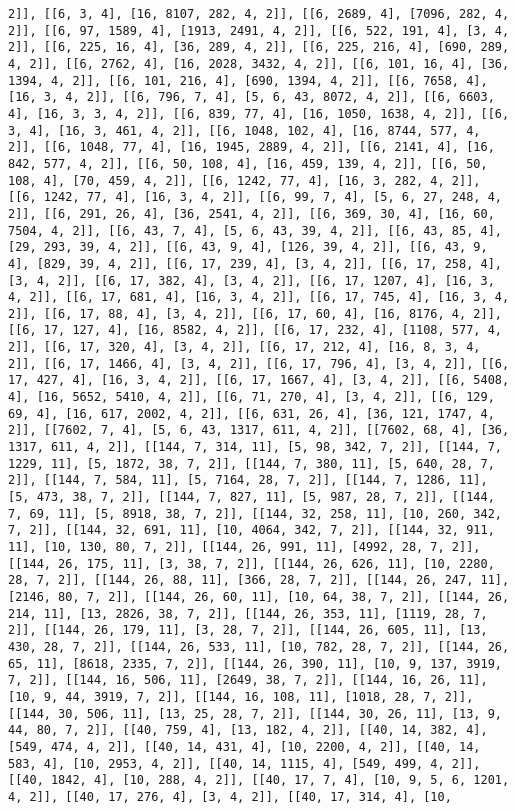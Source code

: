 \documentclass[12pt,fleqn]{article}\usepackage{../../common}
\begin{document}
\begin{verbatim}
2]], [[6, 3, 4], [16, 8107, 282, 4, 2]], [[6, 2689, 4], [7096, 282, 4, 2]], [[6, 97, 1589, 4], [1913, 2491, 4, 2]], [[6, 522, 191, 4], [3, 4, 2]], [[6, 225, 16, 4], [36, 289, 4, 2]], [[6, 225, 216, 4], [690, 289, 4, 2]], [[6, 2762, 4], [16, 2028, 3432, 4, 2]], [[6, 101, 16, 4], [36, 1394, 4, 2]], [[6, 101, 216, 4], [690, 1394, 4, 2]], [[6, 7658, 4], [16, 3, 4, 2]], [[6, 796, 7, 4], [5, 6, 43, 8072, 4, 2]], [[6, 6603, 4], [16, 3, 3, 4, 2]], [[6, 839, 77, 4], [16, 1050, 1638, 4, 2]], [[6, 3, 4], [16, 3, 461, 4, 2]], [[6, 1048, 102, 4], [16, 8744, 577, 4, 2]], [[6, 1048, 77, 4], [16, 1945, 2889, 4, 2]], [[6, 2141, 4], [16, 842, 577, 4, 2]], [[6, 50, 108, 4], [16, 459, 139, 4, 2]], [[6, 50, 108, 4], [70, 459, 4, 2]], [[6, 1242, 77, 4], [16, 3, 282, 4, 2]], [[6, 1242, 77, 4], [16, 3, 4, 2]], [[6, 99, 7, 4], [5, 6, 27, 248, 4, 2]], [[6, 291, 26, 4], [36, 2541, 4, 2]], [[6, 369, 30, 4], [16, 60, 7504, 4, 2]], [[6, 43, 7, 4], [5, 6, 43, 39, 4, 2]], [[6, 43, 85, 4], [29, 293, 39, 4, 2]], [[6, 43, 9, 4], [126, 39, 4, 2]], [[6, 43, 9, 4], [829, 39, 4, 2]], [[6, 17, 239, 4], [3, 4, 2]], [[6, 17, 258, 4], [3, 4, 2]], [[6, 17, 382, 4], [3, 4, 2]], [[6, 17, 1207, 4], [16, 3, 4, 2]], [[6, 17, 681, 4], [16, 3, 4, 2]], [[6, 17, 745, 4], [16, 3, 4, 2]], [[6, 17, 88, 4], [3, 4, 2]], [[6, 17, 60, 4], [16, 8176, 4, 2]], [[6, 17, 127, 4], [16, 8582, 4, 2]], [[6, 17, 232, 4], [1108, 577, 4, 2]], [[6, 17, 320, 4], [3, 4, 2]], [[6, 17, 212, 4], [16, 8, 3, 4, 2]], [[6, 17, 1466, 4], [3, 4, 2]], [[6, 17, 796, 4], [3, 4, 2]], [[6, 17, 427, 4], [16, 3, 4, 2]], [[6, 17, 1667, 4], [3, 4, 2]], [[6, 5408, 4], [16, 5652, 5410, 4, 2]], [[6, 71, 270, 4], [3, 4, 2]], [[6, 129, 69, 4], [16, 617, 2002, 4, 2]], [[6, 631, 26, 4], [36, 121, 1747, 4, 2]], [[7602, 7, 4], [5, 6, 43, 1317, 611, 4, 2]], [[7602, 68, 4], [36, 1317, 611, 4, 2]], [[144, 7, 314, 11], [5, 98, 342, 7, 2]], [[144, 7, 1229, 11], [5, 1872, 38, 7, 2]], [[144, 7, 380, 11], [5, 640, 28, 7, 2]], [[144, 7, 584, 11], [5, 7164, 28, 7, 2]], [[144, 7, 1286, 11], [5, 473, 38, 7, 2]], [[144, 7, 827, 11], [5, 987, 28, 7, 2]], [[144, 7, 69, 11], [5, 8918, 38, 7, 2]], [[144, 32, 258, 11], [10, 260, 342, 7, 2]], [[144, 32, 691, 11], [10, 4064, 342, 7, 2]], [[144, 32, 911, 11], [10, 130, 80, 7, 2]], [[144, 26, 991, 11], [4992, 28, 7, 2]], [[144, 26, 175, 11], [3, 38, 7, 2]], [[144, 26, 626, 11], [10, 2280, 28, 7, 2]], [[144, 26, 88, 11], [366, 28, 7, 2]], [[144, 26, 247, 11], [2146, 80, 7, 2]], [[144, 26, 60, 11], [10, 64, 38, 7, 2]], [[144, 26, 214, 11], [13, 2826, 38, 7, 2]], [[144, 26, 353, 11], [1119, 28, 7, 2]], [[144, 26, 179, 11], [3, 28, 7, 2]], [[144, 26, 605, 11], [13, 430, 28, 7, 2]], [[144, 26, 533, 11], [10, 782, 28, 7, 2]], [[144, 26, 65, 11], [8618, 2335, 7, 2]], [[144, 26, 390, 11], [10, 9, 137, 3919, 7, 2]], [[144, 16, 506, 11], [2649, 38, 7, 2]], [[144, 16, 26, 11], [10, 9, 44, 3919, 7, 2]], [[144, 16, 108, 11], [1018, 28, 7, 2]], [[144, 30, 506, 11], [13, 25, 28, 7, 2]], [[144, 30, 26, 11], [13, 9, 44, 80, 7, 2]], [[40, 759, 4], [13, 182, 4, 2]], [[40, 14, 382, 4], [549, 474, 4, 2]], [[40, 14, 431, 4], [10, 2200, 4, 2]], [[40, 14, 583, 4], [10, 2953, 4, 2]], [[40, 14, 1115, 4], [549, 499, 4, 2]], [[40, 1842, 4], [10, 288, 4, 2]], [[40, 17, 7, 4], [10, 9, 5, 6, 1201, 4, 2]], [[40, 17, 276, 4], [3, 4, 2]], [[40, 17, 314, 4], [10, 
\end{verbatim}
\end{document}
